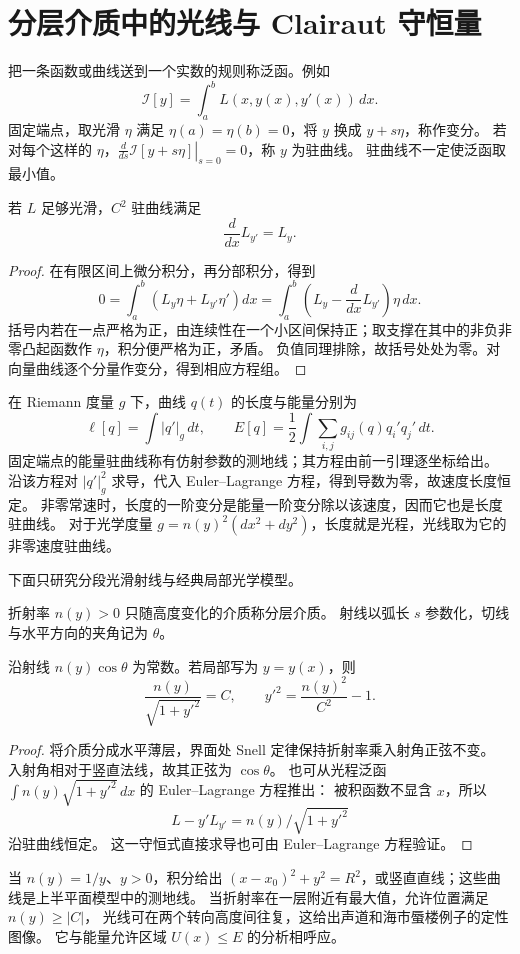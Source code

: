 \section{分层介质中的光线与 Clairaut 守恒量}

\begin{definition}[泛函、变分与驻曲线]\label{def:variation-functional}
把一条函数或曲线送到一个实数的规则称泛函。例如
\[
 \mathcal I[y]=\int_a^b L(x,y(x),y'(x))\,dx.
\]
固定端点，取光滑 $\eta$ 满足 $\eta(a)=\eta(b)=0$，将 $y$ 换成 $y+s\eta$，称作变分。
若对每个这样的 $\eta$，$\left.\frac d{ds}\mathcal I[y+s\eta]\right|_{s=0}=0$，称 $y$ 为驻曲线。
驻曲线不一定使泛函取最小值。
\end{definition}
\begin{lemma}\label{lem:euler-lagrange-elementary}
若 $L$ 足够光滑，$C^2$ 驻曲线满足
\[
 \frac d{dx}L_{y'}=L_y.
\]
\end{lemma}
\begin{proof}
在有限区间上微分积分，再分部积分，得到
\[
 0=\int_a^b(L_y\eta+L_{y'}\eta')dx
 =\int_a^b\left(L_y-\frac d{dx}L_{y'}\right)\eta\,dx.
\]
括号内若在一点严格为正，由连续性在一个小区间保持正；取支撑在其中的非负非零凸起函数作 $\eta$，积分便严格为正，矛盾。
负值同理排除，故括号处处为零。对向量曲线逐个分量作变分，得到相应方程组。
\end{proof}
\begin{definition}[长度、能量与测地线]\label{def:geodesic-variational}
在 Riemann 度量 $g$ 下，曲线 $q(t)$ 的长度与能量分别为
\[
 \ell[q]=\int |q'|_g\,dt,\qquad
 E[q]=\frac12\int\sum_{i,j}g_{ij}(q)q_i'q_j'\,dt.
\]
固定端点的能量驻曲线称有仿射参数的测地线；其方程由前一引理逐坐标给出。
沿该方程对 $|q'|_g^2$ 求导，代入 Euler--Lagrange 方程，得到导数为零，故速度长度恒定。
非零常速时，长度的一阶变分是能量一阶变分除以该速度，因而它也是长度驻曲线。
对于光学度量 $g=n(y)^2(dx^2+dy^2)$，长度就是光程，光线取为它的非零速度驻曲线。
\end{definition}

下面只研究分段光滑射线与经典局部光学模型。
\begin{definition}
折射率 $n(y)>0$ 只随高度变化的介质称分层介质。
射线以弧长 $s$ 参数化，切线与水平方向的夹角记为 $\theta$。
\end{definition}
\begin{proposition}
沿射线 $n(y)\cos\theta$ 为常数。若局部写为 $y=y(x)$，则
\[
 \frac{n(y)}{\sqrt{1+y'^2}}=C,
 \qquad y'^2=\frac{n(y)^2}{C^2}-1.
\]
\end{proposition}
\begin{proof}
将介质分成水平薄层，界面处 Snell 定律保持折射率乘入射角正弦不变。
入射角相对于竖直法线，故其正弦为 $\cos\theta$。
也可从光程泛函 $\displaystyle\int n(y)\sqrt{1+y'^2}\,dx$ 的 Euler--Lagrange 方程推出：
被积函数不显含 $x$，所以
\[
 L-y'L_{y'}=n(y)/\sqrt{1+y'^2}
\]
 沿驻曲线恒定。
这一守恒式直接求导也可由 Euler--Lagrange 方程验证。
\end{proof}
当 $n(y)=1/y$、$y>0$，积分给出
$(x-x_0)^2+y^2=R^2$，或竖直直线；这些曲线是上半平面模型中的测地线。
当折射率在一层附近有最大值，允许位置满足 $n(y)\geq|C|$，
光线可在两个转向高度间往复，这给出声道和海市蜃楼例子的定性图像。
它与能量允许区域 $U(x)\leq E$ 的分析相呼应。

